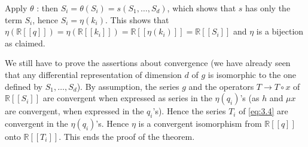 \documentclass[a4paper,12pt]{article}
\newcommand{\R}{\mathbb{R}}
\begin{document}
Apply $\theta$ : then $S_i=\theta\left(S_i\right)=s\left(S_1, \ldots, S_d\right)$, which shows that $s$ has only the term $S_i$, hence $S_i=\eta\left(k_i\right)$. This shows that $\eta(\R[[q]])= \eta(\R[[k_i]]) = \R[[\eta(k_i)]] = \R[[S_i]]$ and $\eta$ is a bijection as claimed.

We still have to prove the assertions about convergence (we have already seen that any differential representation of dimension ${d}$ of ${g}$ is isomorphic to the one defined by $S_1, \ldots, S_d$). 
By assumption, the series $g$ and the operators $T \rightarrow T \circ x$ of $\R[[S_i]]$ are convergent when expressed as series in the $\eta\left({q}_i\right)$'s (as $h$ and $\mu x$ are convergent, when expressed in the $q_i$'s). 
Hence the series $T_i$ of \eqref{eq:3.4} are convergent in the $\eta(q_i)$'s. 
Hence $\eta$ is a convergent isomorphism from $\R[[q]]$ onto $\R[[T_i]]$.
This ends the proof of the theorem.

\color{black}
\end{document}
